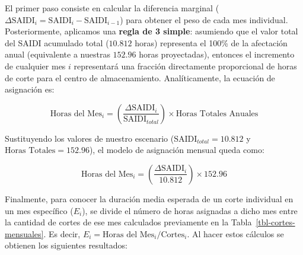 \documentclass[
  spanish,
  letterpaper,
  DIV=11,
  numbers=noendperiod]{scrreprt}
\theoremstyle{plain}
\theoremstyle{plain}
\theoremstyle{plain}
\theoremstyle{definition}
\theoremstyle{remark}
\begin{document}
El primer paso consiste en calcular la diferencia marginal
(\(\Delta \text{SAIDI}_i = \text{SAIDI}_i - \text{SAIDI}_{i-1}\)) para
obtener el peso de cada mes individual. Posteriormente, aplicamos una
\textbf{regla de 3 simple}: asumiendo que el valor total del SAIDI
acumulado total (\(10.812\) horas) representa el 100\% de la afectación
anual (equivalente a nuestras \(152.96\) horas proyectadas), entonces el
incremento de cualquier mes \(i\) representará una fracción directamente
proporcional de horas de corte para el centro de almacenamiento.
Analíticamente, la ecuación de asignación es:

\[
\text{Horas del Mes}_i = \left( \frac{\Delta \text{SAIDI}_i}{\text{SAIDI}_{total}} \right) \times \text{Horas Totales Anuales}
\]

Sustituyendo los valores de nuestro escenario
(\(\text{SAIDI}_{total} = 10.812\) y \(\text{Horas Totales} = 152.96\)),
el modelo de asignación mensual queda como:

\[
\text{Horas del Mes}_i = \left( \frac{\Delta \text{SAIDI}_i}{10.812} \right) \times 152.96
\]

Finalmente, para conocer la duración media esperada de un corte
individual en un mes específico (\(E_i\)), se divide el número de horas
asignadas a dicho mes entre la cantidad de cortes de ese mes calculados
previamente en la Tabla~\ref{tbl-cortes-mensuales}. Es decir,
\(E_i = \text{Horas del Mes}_i / \text{Cortes}_i\). Al hacer estos
cálculos se obtienen los siguientes resultados:
\end{document}
